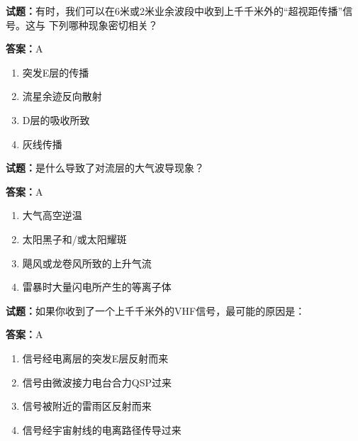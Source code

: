 \documentclass{ctexbook}
\begin{document}




\vspace{1em}

\textbf{试题：}有时，我们可以在6米或2米业余波段中收到上千千米外的“超视距传播”信号。这与
下列哪种现象密切相关？ 

\textbf{答案：}A 

\begin{enumerate}[leftmargin=3em]
  \item 突发E层的传播 

  \item 流星余迹反向散射 

  \item D层的吸收所致 

  \item 灰线传播 

\end{enumerate}





\vspace{1em}

\textbf{试题：}是什么导致了对流层的大气波导现象？ 

\textbf{答案：}A 

\begin{enumerate}[leftmargin=3em]
  \item 大气高空逆温 


  \item 太阳黑子和/或太阳耀斑 

  \item 飓风或龙卷风所致的上升气流 

  \item 雷暴时大量闪电所产生的等离子体 

\end{enumerate}





\vspace{1em}

\textbf{试题：}如果你收到了一个上千千米外的VHF信号，最可能的原因是： 

\textbf{答案：}A 

\begin{enumerate}[leftmargin=3em]
  \item 信号经电离层的突发E层反射而来 

  \item 信号由微波接力电台合力QSP过来 

  \item 信号被附近的雷雨区反射而来 

  \item 信号经宇宙射线的电离路径传导过来 

\end{enumerate}
\end{document}
